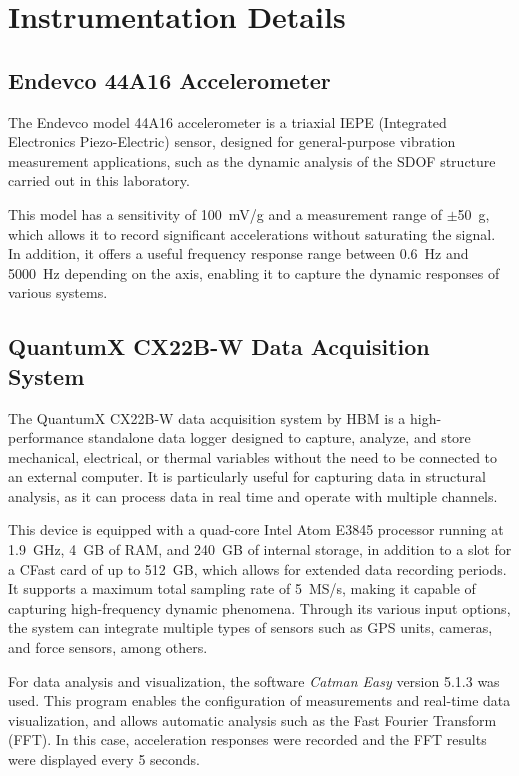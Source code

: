 \documentclass{article}  %
\begin{document}
\newpage
\section{Instrumentation Details} 

\subsection{Endevco 44A16 Accelerometer}

The Endevco model 44A16 accelerometer is a triaxial IEPE (Integrated Electronics Piezo-Electric) sensor, designed for general-purpose vibration measurement applications, such as the dynamic analysis of the SDOF structure carried out in this laboratory. 

This model has a sensitivity of 100~mV/g and a measurement range of $\pm$50~g, which allows it to record significant accelerations without saturating the signal. In addition, it offers a useful frequency response range between 0.6~Hz and 5000~Hz depending on the axis, enabling it to capture the dynamic responses of various systems.


\subsection{QuantumX CX22B-W Data Acquisition System}

The QuantumX CX22B-W data acquisition system by HBM is a high-performance standalone data logger designed to capture, analyze, and store mechanical, electrical, or thermal variables without the need to be connected to an external computer. It is particularly useful for capturing data in structural analysis, as it can process data in real time and operate with multiple channels.

This device is equipped with a quad-core Intel Atom E3845 processor running at 1.9~GHz, 4~GB of RAM, and 240~GB of internal storage, in addition to a slot for a CFast card of up to 512~GB, which allows for extended data recording periods. It supports a maximum total sampling rate of 5~MS/s, making it capable of capturing high-frequency dynamic phenomena. Through its various input options, the system can integrate multiple types of sensors such as GPS units, cameras, and force sensors, among others.

For data analysis and visualization, the software \textit{Catman Easy} version 5.1.3 was used. This program enables the configuration of measurements and real-time data visualization, and allows automatic analysis such as the Fast Fourier Transform (FFT). In this case, acceleration responses were recorded and the FFT results were displayed every 5 seconds.
\end{document}
